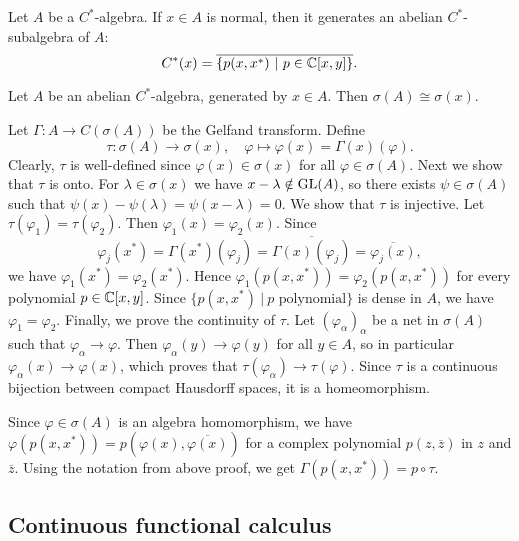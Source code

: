 \begin{remark}
  Let $A$ be a $C^*$-algebra. If $x \in A$ is normal, then it generates an abelian $C^*$-subalgebra of $A$:
  $$C^* (x) = \overline{\{p(x, x^*)\ |\ p \in \mathbb {C}[x, y]\}}.$$
\end{remark}

\begin{corollary}
  Let $A$ be an abelian $C^*$-algebra, generated by $x \in A$. Then $\sigma (A) \cong \sigma(x)$.
\end{corollary}

\begin{myproof}
  Let $\Gamma: A \to C(\sigma(A))$ be the Gelfand transform.
  Define $$\tau: \sigma(A) \to \sigma(x),\quad \varphi \mapsto \varphi(x) = \Gamma(x) (\varphi).$$
  Clearly, $\tau$ is well-defined since $\varphi(x) \in \sigma (x)$ for all $\varphi \in \sigma (A)$.
  Next we show that $\tau$ is onto. For $\lambda \in \sigma(x)$ we have
  $x - \lambda \notin \operatorname{GL}(A)$, so there exists $\psi \in \sigma(A)$ such that $\psi(x) - \psi (\lambda) = \psi (x - \lambda) = 0$.
  We show that $\tau$ is injective. Let $\tau (\varphi_1) = \tau(\varphi_2)$.
  Then $\varphi_1(x) = \varphi_2(x)$. Since 
  $$\varphi_j (x^*) = \Gamma(x^*) (\varphi_j) = \overline{\Gamma(x)(\varphi_j)} = \overline{\varphi_j(x)},$$
  we have $\varphi_1(x^*) = \varphi_2(x^*)$. Hence $\varphi_1 (p(x, x^*)) = \varphi_2(p(x, x^*))$ for every polynomial $p \in \mathbb {C} [x, y]$.
  Since $\{p(x, x^*)\ |\ \textrm{$p$ polynomial}\}$ is dense in $A$, we have $\varphi_1 = \varphi_2$.
  Finally, we prove the continuity of $\tau$. Let $(\varphi_\alpha)_{\alpha}$ be a net in $\sigma(A)$ such that $\varphi_\alpha \to \varphi$.
  Then $\varphi_\alpha(y) \to \varphi(y)$ for all $y \in A$, so in particular $\varphi_\alpha (x) \to \varphi(x)$,
  which proves that $\tau (\varphi_\alpha) \to \tau(\varphi)$. Since $\tau$ is a continuous bijection between compact
  Hausdorff spaces, it is a homeomorphism.
\end{myproof}

\begin{remark}
  Since $\varphi \in \sigma(A)$ is an algebra homomorphism, we have $\varphi(p(x, x^*)) = p(\varphi(x), \overline{\varphi(x)})$
  for a complex polynomial $p(z, \overline{z})$ in $z$ and $\overline{z}$. Using the notation from above proof, 
  we get $\Gamma (p(x, x^*)) = p \circ \tau$.
\end{remark}

\subsection{Continuous functional calculus}

